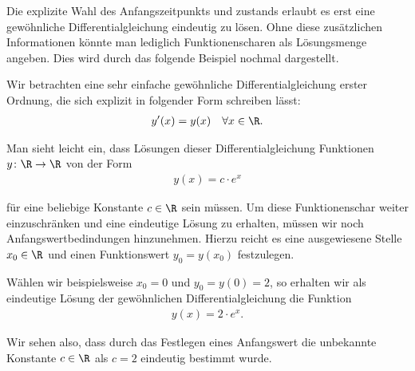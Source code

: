 \documentclass[letterpaper,10pt,english]{jupyterBook}
\begin{document}
\par
Die explizite Wahl des Anfangszeitpunkts und  zustands erlaubt es erst eine gewöhnliche Differentialgleichung eindeutig zu lösen.
Ohne diese zusätzlichen Informationen könnte man lediglich Funktionenscharen als Lösungsmenge angeben.
Dies wird durch das folgende Beispiel nochmal dargestellt.
\label{ode/repetition:example-6}
\begin{example}{}{}



\par
Wir betrachten eine sehr einfache gewöhnliche Differentialgleichung erster Ordnung, die sich explizit in folgender Form schreiben lässt:
\begin{align*}
y'(x) = y(x) \quad \forall x \in \R.
\end{align*}
\par
Man sieht leicht ein, dass Lösungen dieser Differentialgleichung Funktionen \(y \colon \R \rightarrow \R\) von der Form
\begin{align*}
y(x) = c\cdot e^x
\end{align*}
\par
für eine beliebige Konstante \(c \in \R\) sein müssen.
Um diese Funktionenschar weiter einzuschränken und eine eindeutige Lösung zu erhalten, müssen wir noch Anfangswertbedindungen hinzunehmen.
Hierzu reicht es eine ausgewiesene Stelle \(x_0 \in \R\) und einen Funktionswert \(y_0 = y(x_0)\) festzulegen.

\par
Wählen wir beispielsweise \(x_0 = 0\) und \(y_0 = y(0) = 2\), so erhalten wir als eindeutige Lösung der gewöhnlichen Differentialgleichung die Funktion
\begin{align*}
y(x) = 2\cdot e^x.
\end{align*}
\par
Wir sehen also, dass durch das Festlegen eines Anfangswert die unbekannte Konstante \(c \in \R\) als \(c=2\) eindeutig bestimmt wurde.
\end{example}
\end{document}

